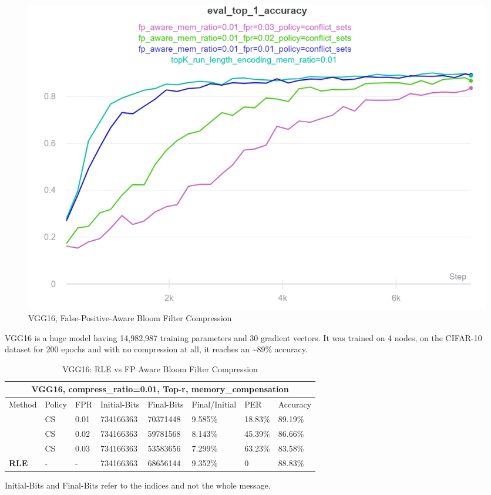     \begin{figure}[h]
    \centering
    \includegraphics[width=1\textwidth]{thesis/figures/vgg16-bloom.png}
    \caption{VGG16, False-Positive-Aware Bloom Filter Compression}
    \label{fpa-vgg16}
    \end{figure}
    
    \vspace{1cm}

    VGG16 is a huge model having 14,982,987 training parameters and 30 gradient vectors.
    It was trained on 4 nodes, on the CIFAR-10 dataset for 200 epochs and with no compression at all, it reaches an \textasciitilde89\% accuracy.
    
    \vspace{1cm}

    \begin{table}[h!]
    \footnotesize
     \centering
    \begin{tabular}{ |p{3cm}||p{1cm}|p{1cm}|p{2cm}|p{1.6cm}|p{1.6cm}|p{1.3cm}|p{1.5cm}|}
    \hline
    \multicolumn{8}{|c|}{\textbf{\footnotesize VGG16, compress\_ratio=0.01, Top-r, memory\_compensation}} \\
    \hline
    \rule{0pt}{3ex}
    	Method & Policy & FPR  &Initial-Bits &Final-Bits &Final/Initial & PER & Accuracy\\
    \hline
    \rule{0pt}{3ex}
    \multirow{4}{*}{\textbf{Fp-Aware Bloom}}
    & CS   &0.01     &   734166363 &   70371448 &   9.585\%  &18.83\%   &89.19\%\\
    & CS   &0.02     &   734166363 &   59781568 &   8.143\%  &45.39\%   &86.66\%\\
    & CS   &0.03     &   734166363 &   53583656 &   7.299\%  &63.23\%   &83.58\%\\
    \hline
    \rule{0pt}{3ex}
    \textbf{RLE}    & - & - & 734166363 & 68656144 & 9.352\%  &0   &88.83\%\\
    \hline
    \end{tabular}
    \caption{VGG16: RLE vs FP Aware Bloom Filter Compression}
    Initial-Bits and Final-Bits refer to the indices and not the whole message. 
    \label{table:4}
    \end{table}

